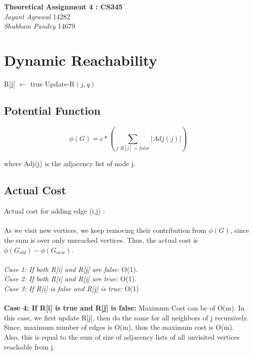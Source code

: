\documentclass{article}
\begin{document}

\begin{center}
\textbf{\Large Theoretical Assignment 4 : CS345} \\
\textit{\large Jayant Agrawal}         14282 \\
\textit{\large Shubham Pandey}         14679
\end{center}

\section{Dynamic Reachability}

\begin{algorithm}
\label{dyn}
\begin{algorithmic}[1]
\State R[j] $\gets$ true
 
\State Update-R$(j,q)$
\EndFor
\EndIf
\EndProcedure
\end{algorithmic}
\end{algorithm}

\subsection{Potential Function}

$$\phi(G) = c *(\sum_{j:R[j] = false} |Adj(j)| )$$

where Adj(j) is the adjacency list of node j.

\subsection{Actual Cost}

Actual cost for adding edge (i,j) : \\ \\
As we visit new vertices, we keep removing their contribution from $\phi(G)$, since the sum is over only unreached vertices. Thus, the actual cost is $\phi(G_{old}) - \phi(G_{new})$. \\ \\
\emph{ Case 1: If both R[i] and R[j] are false:} O(1). \\
\emph{ Case 2: If both R[i] and R[j] are true:} O(1). \\
\emph{ Case 3: If R[i] is false and R[j] is true: }O(1) \\ \\
\textbf{Case 4: If R[i] is true and R[j] is false: } Maximum Cost can be of O(m). In this case, we first update R[j], then do the same for all neighbors of j recursively. Since, maximum number of edges is O(m), thus the maximum cost is O(m). \\
Also, this is equal to the sum of size of adjacency lists of all unvisited vertices reachable from j. 
\end{document}
